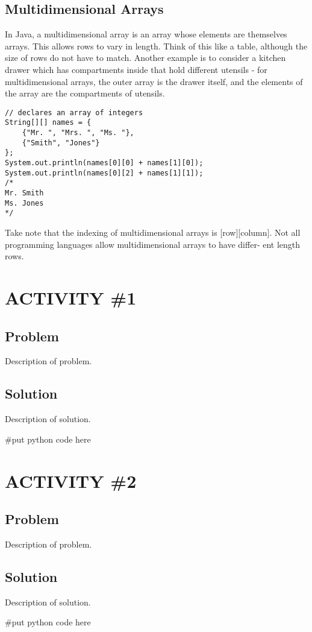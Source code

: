 \documentclass[14pt]{extreport}%
\begin{document}
\subsection*{Multidimensional Arrays}
In Java, a multidimensional array is an array whose elements are themselves
arrays. This allows rows to vary in length. Think of this like a table, although
the size of rows do not have to match. Another example is to consider a
kitchen drawer which has compartments inside that hold different utensils
- for multidimensional arrays, the outer array is the drawer itself, and the
elements of the array are the compartments of utensils.
\begin{lstlisting}
// declares an array of integers
String[][] names = {
    {"Mr. ", "Mrs. ", "Ms. "},
    {"Smith", "Jones"}
};
System.out.println(names[0][0] + names[1][0]);
System.out.println(names[0][2] + names[1][1]);
/*
Mr. Smith
Ms. Jones
*/
\end{lstlisting}{}
Take note that the indexing of multidimensional arrays is [row][column].
Not all programming languages allow multidimensional arrays to have differ-
ent length rows.
\section*{ACTIVITY \#1} 
\subsection*{Problem}
Description of problem.
\subsection*{Solution}
Description of solution.\\
\begin{python}
#put python code here

\end{python}

\section*{ACTIVITY \#2} 
\subsection*{Problem}
Description of problem.

\subsection*{Solution}
Description of solution.\\
\begin{python}
#put python code here
\end{python}
\end{document}
